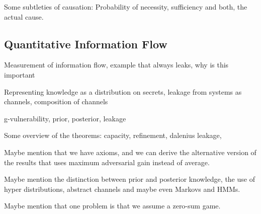 {\color{red} Some subtleties of causation: Probability of necessity, sufficiency and both, the actual cause.}

\subsection{Quantitative Information Flow}

{\color{red} Measurement of information flow, example that always leaks, why is this important}

{\color{red} Representing knowledge as a distribution on secrets, leakage from systems as channels, composition of channels}

{\color{red} g-vulnerability, prior, posterior, leakage}

{\color{red} Some overview of the theorems: capacity, refinement, dalenius leakage, }

{\color{red} Maybe mention that we have axioms, and we can derive the alternative version of the results that uses maximum adversarial gain instead of average.}

{\color{red} Maybe mention the distinction between prior and posterior knowledge, the use of hyper distributions, abstract channels and maybe even Markovs and HMMs.}

{\color{red} Maybe mention that one problem is that we assume a zero-sum game.}
